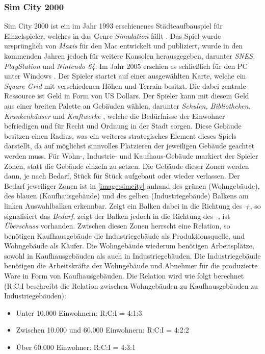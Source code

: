 \subsubsection{Sim City 2000}
Sim City 2000 ist ein im Jahr 1993 erschienenes Städteaufbauspiel für Einzelspieler, welches in das Genre \textit{Simulation} fällt \cite{simcity:ea}. Das Spiel wurde ursprünglich von \textit{Maxis} für den Mac entwickelt und publiziert, wurde in den kommenden Jahren jedoch für weitere Konsolen herausgegeben, darunter \textit{SNES, PlayStation} und \textit{Nintendo 64}. Im Jahr 2005 erschien es schließlich für den PC unter Windows \cite{simcity:igdb}. Der Spieler startet auf einer ausgewählten Karte, welche ein \textit{Square Grid} mit verschiedenen Höhen und Terrain besitzt. Die dabei zentrale Ressource ist Geld in Form von US Dollars. Der Spieler kann mit diesem Geld aus einer breiten Palette an Gebäuden wählen, darunter \textit{Schulen, Bibliotheken, Krankenhäuser} und \textit{Kraftwerke} \cite*[]{simcity:igdb}, welche die Bedürfnisse der Einwohner befriedigen und für Recht und Ordnung in der Stadt sorgen. Diese Gebäude besitzen einen Radius, was ein weiteres strategisches Element dieses Spiels darstellt, da auf möglichst sinnvolles Platzieren der jeweiligen Gebäude geachtet werden muss. Für Wohn-, Industrie- und Kaufhaus-Gebäude markiert der Spieler Zonen, statt die Gebäude einzeln zu setzen. Die Gebäude dieser Zonen werden dann, je nach Bedarf, Stück für Stück aufgebaut oder wieder verlassen. Der Bedarf jeweiliger Zonen ist in \autoref{image:simcity} anhand des grünen (Wohngebäude), des blauen (Kaufhausgebäude) und des gelben (Industriegebäude) Balkens am linken Auswahlbalken erkennbar. Zeigt ein Balken dabei in die Richtung des \textit{+}, so signalisiert das \textit{Bedarf}, zeigt der Balken jedoch in die Richtung des \textit{-}, ist \textit{Überschuss} vorhanden. Zwischen diesen Zonen herrscht eine Relation, so benötigen Kaufhausgebäude die Industriegebäude als Produktionsquelle, und Wohngebäude als Käufer. Die Wohngebäude wiederum benötigen Arbeitsplätze, sowohl in Kaufhausgebäuden als auch in Industriegebäuden. Die Industriegebäude benötigen die Arbeitskräfte der Wohngebäude und Abnehmer für die produzierte Ware in Form von Kaufhausgebäuden. Die Relation wird wie folgt berechnet (R:C:I beschreibt die Relation zwischen Wohngebäuden zu Kaufhausgebäuden zu Industriegebäuden): 
\begin{itemize}
    \item Unter 10.000 Einwohnern: R:C:I = 4:1:3
    \item Zwischen 10.000 und 60.000 Einwohnern: R:C:I = 4:2:2
    \item Über 60.000 Einwohner: R:C:I = 4:3:1 \cite*[]{simcity:somacon}
\end{itemize}
